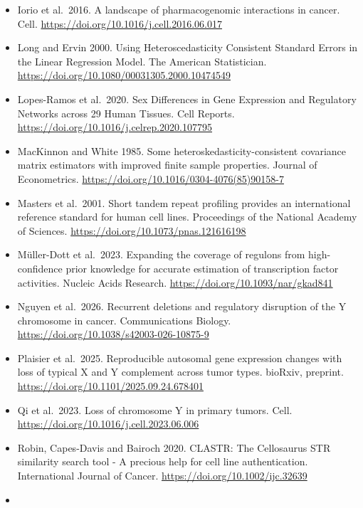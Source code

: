 \documentclass[
  11pt,
  letterpaper,
]{article}
\begin{document}
\begin{itemize}
  Huang 2026. Cell lines that share a well are not independent
  observations in the Tahoe-100M drug screen. arXiv, preprint,
  arXiv:2611.01604v1 {[}q-bio.QM{]}, submitted 1 November 2026.
  \url{https://arxiv.org/abs/2611.01604v1}
\item
  Iorio et al.~2016. A landscape of pharmacogenomic interactions in
  cancer. Cell. \url{https://doi.org/10.1016/j.cell.2016.06.017}
\item
  Long and Ervin 2000. Using Heteroscedasticity Consistent Standard
  Errors in the Linear Regression Model. The American Statistician.
  \url{https://doi.org/10.1080/00031305.2000.10474549}
\item
  Lopes-Ramos et al.~2020. Sex Differences in Gene Expression and
  Regulatory Networks across 29 Human Tissues. Cell Reports.
  \url{https://doi.org/10.1016/j.celrep.2020.107795}
\item
  MacKinnon and White 1985. Some heteroskedasticity-consistent
  covariance matrix estimators with improved finite sample properties.
  Journal of Econometrics.
  \url{https://doi.org/10.1016/0304-4076(85)90158-7}
\item
  Masters et al.~2001. Short tandem repeat profiling provides an
  international reference standard for human cell lines. Proceedings of
  the National Academy of Sciences.
  \url{https://doi.org/10.1073/pnas.121616198}
\item
  Müller-Dott et al.~2023. Expanding the coverage of regulons from
  high-confidence prior knowledge for accurate estimation of
  transcription factor activities. Nucleic Acids Research.
  \url{https://doi.org/10.1093/nar/gkad841}
\item
  Nguyen et al.~2026. Recurrent deletions and regulatory disruption of
  the Y chromosome in cancer. Communications Biology.
  \url{https://doi.org/10.1038/s42003-026-10875-9}
\item
  Plaisier et al.~2025. Reproducible autosomal gene expression changes
  with loss of typical X and Y complement across tumor types. bioRxiv,
  preprint. \url{https://doi.org/10.1101/2025.09.24.678401}
\item
  Qi et al.~2023. Loss of chromosome Y in primary tumors. Cell.
  \url{https://doi.org/10.1016/j.cell.2023.06.006}
\item
  Robin, Capes-Davis and Bairoch 2020. CLASTR: The Cellosaurus STR
  similarity search tool - A precious help for cell line authentication.
  International Journal of Cancer.
  \url{https://doi.org/10.1002/ijc.32639}
\item

\end{itemize}
\end{document}
